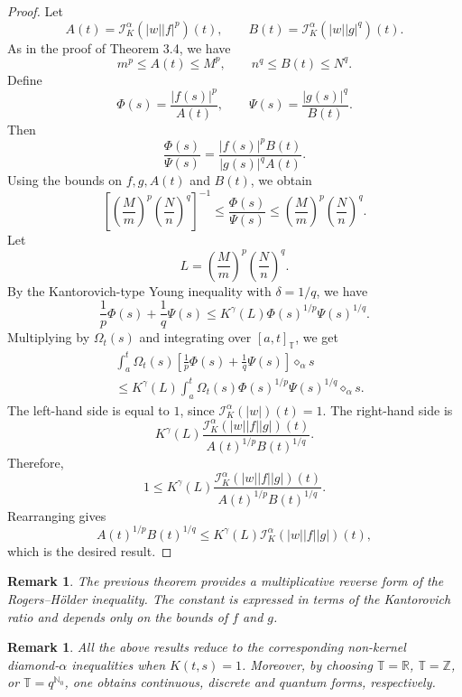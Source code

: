 \documentclass[11pt]{article}
\newtheorem{remark}[theorem]{Remark}
\begin{document}
\begin{proof}
Let
\[
    A(t)=\mathcal{I}_{K}^{\alpha}(|w||f|^p)(t),
    \qquad
    B(t)=\mathcal{I}_{K}^{\alpha}(|w||g|^q)(t).
\]
As in the proof of Theorem 3.4, we have
\[
    m^p\leq A(t)\leq M^p,
    \qquad
    n^q\leq B(t)\leq N^q.
\]
Define
\[
    \Phi(s)=\frac{|f(s)|^p}{A(t)},
    \qquad
    \Psi(s)=\frac{|g(s)|^q}{B(t)}.
\]
Then
\[
    \frac{\Phi(s)}{\Psi(s)}
    =
    \frac{|f(s)|^p B(t)}{|g(s)|^q A(t)}.
\]
Using the bounds on $f,g,A(t)$ and $B(t)$, we obtain
\[
\left[
\left(\frac{M}{m}\right)^p
\left(\frac{N}{n}\right)^q
\right]^{-1}
\leq
\frac{\Phi(s)}{\Psi(s)}
\leq
\left(\frac{M}{m}\right)^p
\left(\frac{N}{n}\right)^q.
\]
Let
\[
    L=
    \left(\frac{M}{m}\right)^p
    \left(\frac{N}{n}\right)^q.
\]
By the Kantorovich-type Young inequality with $\delta=1/q$, we have
\[
    \frac1p\Phi(s)+\frac1q\Psi(s)
    \leq
    K^{\gamma}(L)\Phi(s)^{1/p}\Psi(s)^{1/q}.
\]
Multiplying by $\Omega_t(s)$ and integrating over $[a,t]_{\mathbb{T}}$, we get
\[
\begin{aligned}
&\int_a^t\Omega_t(s)
\left[
\frac1p\Phi(s)+\frac1q\Psi(s)
\right]\diamond_{\alpha}s                                      \\
&\leq
K^{\gamma}(L)
\int_a^t\Omega_t(s)\Phi(s)^{1/p}\Psi(s)^{1/q}
\diamond_{\alpha}s.
\end{aligned}
\]
The left-hand side is equal to $1$, since
$\mathcal{I}_{K}^{\alpha}(|w|)(t)=1$. The right-hand side is
\[
    K^{\gamma}(L)
    \frac{
    \mathcal{I}_{K}^{\alpha}(|w||f||g|)(t)
    }
    {
    A(t)^{1/p}B(t)^{1/q}
    }.
\]
Therefore,
\[
    1
    \leq
    K^{\gamma}(L)
    \frac{
    \mathcal{I}_{K}^{\alpha}(|w||f||g|)(t)
    }
    {
    A(t)^{1/p}B(t)^{1/q}
    }.
\]
Rearranging gives
\[
    A(t)^{1/p}B(t)^{1/q}
    \leq
    K^{\gamma}(L)
    \mathcal{I}_{K}^{\alpha}(|w||f||g|)(t),
\]
which is the desired result.
\end{proof}

\begin{remark}
The previous theorem provides a multiplicative reverse form of the
Rogers--H\"older inequality. The constant is expressed in terms of the
Kantorovich ratio and depends only on the bounds of $f$ and $g$.
\end{remark}

\begin{remark}
All the above results reduce to the corresponding non-kernel diamond-$\alpha$
inequalities when $K(t,s)=1$. Moreover, by choosing
$\mathbb{T}=\mathbb{R}$, $\mathbb{T}=\mathbb{Z}$, or
$\mathbb{T}=q^{\mathbb{N}_0}$, one obtains continuous, discrete and quantum
forms, respectively.
\end{remark}
\end{document}
